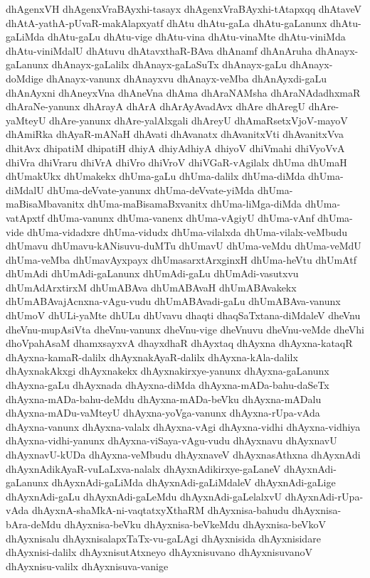 {dhAgenxVH
dhAgenxVraBAyxhi-tasayx
dhAgenxVraBAyxhi-tAtapxqq
dhAtaveV
dhAtA-yathA-pUvaR-makAlapxyatf
dhAtu
dhAtu-gaLa
dhAtu-gaLanunx
dhAtu-gaLiMda
dhAtu-gaLu
dhAtu-vige
dhAtu-vina
dhAtu-vinaMte
dhAtu-viniMda
dhAtu-viniMdalU
dhAtuvu
dhAtavxthaR-BAva
dhAnamf
dhAnAruha
dhAnayx-gaLanunx
dhAnayx-gaLalilx
dhAnayx-gaLaSuTx
dhAnayx-gaLu
dhAnayx-doMdige
dhAnayx-vanunx
dhAnayxvu
dhAnayx-veMba
dhAnAyxdi-gaLu
dhAnAyxni
dhAneyxVna
dhAneVna
dhAma
dhAraNAMsha
dhAraNAdadhxmaR
dhAraNe-yanunx
dhArayA
dhArA
dhArAyAvadAvx
dhAre
dhAregU
dhAre-yaMteyU
dhAre-yanunx
dhAre-yalAlxgali
dhAreyU
dhAmaRsetxVjoV-mayoV
dhAmiRka
dhAyaR-mANaH
dhAvati
dhAvanatx
dhAvanitxVti
dhAvanitxVva
dhitAvx
dhipatiM
dhipatiH
dhiyA
dhiyAdhiyA
dhiyoV
dhiVmahi
dhiVyoVvA
dhiVra
dhiVraru
dhiVrA
dhiVro
dhiVroV
dhiVGaR-vAgilalx
dhUma
dhUmaH
dhUmakUkx
dhUmakekx
dhUma-gaLu
dhUma-dalilx
dhUma-diMda
dhUma-diMdalU
dhUma-deVvate-yanunx
dhUma-deVvate-yiMda
dhUma-maBisaMbavanitx
dhUma-maBisamaBxvanitx
dhUma-liMga-diMda
dhUma-vatApxtf
dhUma-vanunx
dhUma-vanenx
dhUma-vAgiyU
dhUma-vAnf
dhUma-vide
dhUma-vidadxre
dhUma-vidudx
dhUma-vilalxda
dhUma-vilalx-veMbudu
dhUmavu
dhUmavu-kANisuvu-duMTu
dhUmavU
dhUma-veMdu
dhUma-veMdU
dhUma-veMba
dhUmavAyxpayx
dhUmasarxtArxginxH
dhUma-heVtu
dhUmAtf
dhUmAdi
dhUmAdi-gaLanunx
dhUmAdi-gaLu
dhUmAdi-vasutxvu
dhUmAdArxtirxM
dhUmABAva
dhUmABAvaH
dhUmABAvakekx
dhUmABAvajAcnxna-vAgu-vudu
dhUmABAvadi-gaLu
dhUmABAva-vanunx
dhUmoV
dhULi-yaMte
dhULu
dhUvavu
dhaqti
dhaqSaTxtana-diMdaleV
dheVnu
dheVnu-mupAsiVta
dheVnu-vanunx
dheVnu-vige
dheVnuvu
dheVnu-veMde
dheVhi
dhoVpahAsaM
dhamxsayxvA
dhayxdhaR
dhAyxtaq
dhAyxna
dhAyxna-kataqR
dhAyxna-kamaR-dalilx
dhAyxnakAyaR-dalilx
dhAyxna-kAla-dalilx
dhAyxnakAkxgi
dhAyxnakekx
dhAyxnakirxye-yanunx
dhAyxna-gaLanunx
dhAyxna-gaLu
dhAyxnada
dhAyxna-diMda
dhAyxna-mADa-bahu-daSeTx
dhAyxna-mADa-bahu-deMdu
dhAyxna-mADa-beVku
dhAyxna-mADalu
dhAyxna-mADu-vaMteyU
dhAyxna-yoVga-vanunx
dhAyxna-rUpa-vAda
dhAyxna-vanunx
dhAyxna-valalx
dhAyxna-vAgi
dhAyxna-vidhi
dhAyxna-vidhiya
dhAyxna-vidhi-yanunx
dhAyxna-viSaya-vAgu-vudu
dhAyxnavu
dhAyxnavU
dhAyxnavU-kUDa
dhAyxna-veMbudu
dhAyxnaveV
dhAyxnasAthxna
dhAyxnAdi
dhAyxnAdikAyaR-vuLaLxva-nalalx
dhAyxnAdikirxye-gaLaneV
dhAyxnAdi-gaLanunx
dhAyxnAdi-gaLiMda
dhAyxnAdi-gaLiMdaleV
dhAyxnAdi-gaLige
dhAyxnAdi-gaLu
dhAyxnAdi-gaLeMdu
dhAyxnAdi-gaLelalxvU
dhAyxnAdi-rUpa-vAda
dhAyxnA-shaMkA-ni-vaqtatxyXthaRM
dhAyxnisa-bahudu
dhAyxnisa-bAra-deMdu
dhAyxnisa-beVku
dhAyxnisa-beVkeMdu
dhAyxnisa-beVkoV
dhAyxnisalu
dhAyxnisalapxTaTx-vu-gaLAgi
dhAyxnisida
dhAyxnisidare
dhAyxnisi-dalilx
dhAyxnisutAtxneyo
dhAyxnisuvano
dhAyxnisuvanoV
dhAyxnisu-valilx
dhAyxnisuva-vanige
}
